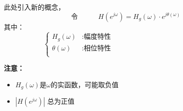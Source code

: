 \documentclass[notheorems,compress,mathserif,table]{beamer}
\begin{document}
\begin{frame}[allowframebreaks]\frametitle{}%

    此处引入新的概念，
    $$\mbox{令}\quad\quad\quad
    H(e^{j\omega})  =  H_g(\omega)\cdot e^{j\theta(\omega)}$$
    其中：
    $$
    \left\{ \begin{aligned}
        H_g(\omega)     &: \mbox{幅度特性}\quad\quad\quad\quad
        \quad\quad\quad\quad\quad\quad\quad\quad\quad\quad\\
        \theta(\omega)  &: \mbox{相位特性}\\
    \end{aligned} \right.
    $$

    \textbf{注意：}
    \begin{itemize}
      \item $H_g(\omega)$是$\omega$的实函数，可能取负值
      \item $|H(e^{j\omega})|$ 总为正值
    \end{itemize}


\end{frame}
\end{document}
